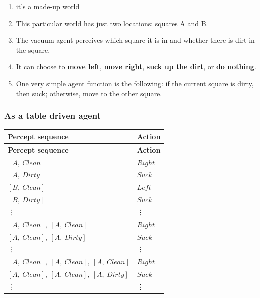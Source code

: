 \begin{enumerate}[itemsep=0.2cm]
    \item it’s a made-up world

    \item This particular world has just two locations: squares A and B. 
    
    \item The vacuum agent perceives which square it is in and whether there is dirt in the square. 
    
    \item It can choose to \textbf{move left}, \textbf{move right}, \textbf{suck up the dirt}, or \textbf{do nothing}.

    \item One very simple agent function is the following: if the current square is dirty, then suck; otherwise, move to the other square.

    
\end{enumerate}



\subsubsection{As a table driven agent}

\begin{customArrayStretch}{1.3}
\begin{longtable}{|l|l|}

\hline
\textbf{Percept sequence} & \textbf{Action} \\ \hline
\endhead

\hline
\textbf{Percept sequence} & \textbf{Action} \\ \hline
\endfirsthead

\hline\endfoot
\hline\endlastfoot


$[A, \ Clean]$ & $Right$ \\ 
$[A, \ Dirty]$ & $Suck$ \\ 
$[B, \ Clean]$ & $Left$ \\ 
$[B, \ Dirty]$ & $Suck$ \\ 

\vdots & \vdots \\

$[A, \ Clean],\ [A, \ Clean]$ & $Right$ \\ 
$[A, \ Clean],\ [A, \ Dirty]$ & $Suck$ \\ 

\vdots & \vdots \\

$[A, \ Clean],\ [A, \ Clean],\ [A, \ Clean]$ & $Right$ \\ 
$[A, \ Clean],\ [A, \ Clean],\ [A, \ Dirty]$ & $Suck$ \\ 

\vdots & \vdots \\

\end{longtable}
\end{customArrayStretch}





